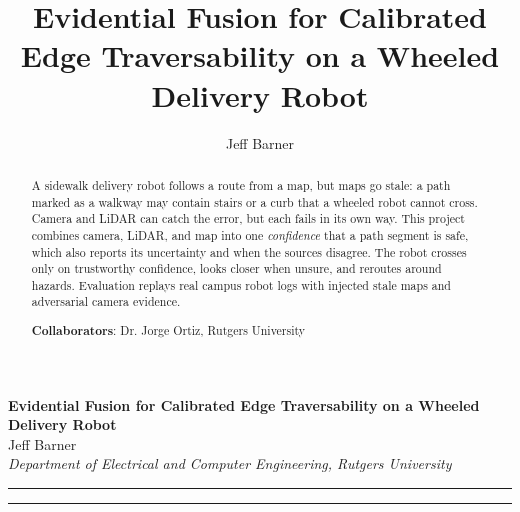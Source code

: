 \documentclass[10pt]{article}
\author{Jeff Barner}
\title{Evidential Fusion for Calibrated Edge Traversability on a Wheeled Delivery Robot}
\begin{document}
	\begin{center}
		{\Large \textbf{Evidential Fusion for Calibrated Edge Traversability on a Wheeled Delivery Robot}}\\
		\vspace{1em}
		{\large Jeff Barner}\\
		\vspace{1em}
		\textit{Department of Electrical and Computer Engineering, Rutgers University}
	\end{center}


	\begin{center}
		\rule{150mm}{0.2mm}
	\end{center}

	\begin{abstract}

	A sidewalk delivery robot follows a route from a map, but maps go stale: a path marked as a walkway
	may contain stairs or a curb that a wheeled robot cannot cross. Camera and LiDAR can catch the error,
	but each fails in its own way. This project combines camera, LiDAR, and map into one \emph{confidence}
	that a path segment is safe, which also reports its uncertainty and when the sources disagree. The robot
	crosses only on trustworthy confidence, looks closer when unsure, and reroutes around hazards. Evaluation
	replays real campus robot logs with injected stale maps and adversarial camera evidence.

	\textbf{Collaborators}: Dr. Jorge Ortiz, Rutgers University
	\end{abstract}

	\begin{center}
		\rule{150mm}{0.2mm}
	\end{center}

	\vspace{1mm}
\end{document}
